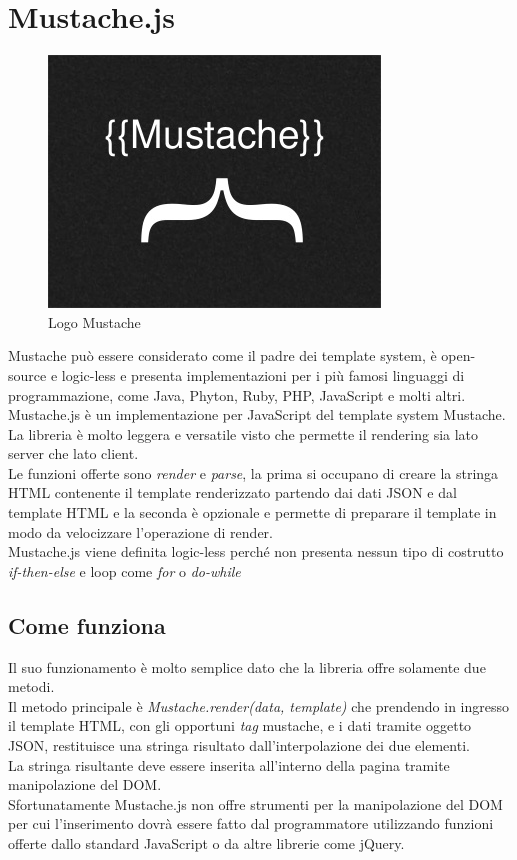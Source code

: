\newpage

\section{Mustache.js}

\begin{figure}[htp]
	\centering
	\includegraphics[scale=0.44]{../immagini/mustache_logo_2}
	\caption{Logo  Mustache}
\end{figure}

Mustache può essere considerato come il padre dei template system, è open-source e logic-less e presenta implementazioni per i più famosi linguaggi di programmazione, come Java, Phyton, Ruby, PHP, JavaScript e molti altri.\\
Mustache.js è un implementazione per JavaScript del template system Mustache.\\
La libreria è molto leggera e versatile visto che permette il rendering sia lato server che lato client.\\
Le funzioni offerte sono \textit{render} e \textit{parse}, la prima si occupano di creare la stringa HTML contenente il template renderizzato partendo dai dati JSON e dal template HTML e la seconda è opzionale e permette di preparare il template in modo da velocizzare l'operazione di render.\\
Mustache.js viene definita logic-less perché non presenta nessun tipo di costrutto \textit{if-then-else} e loop come \textit{for} o \textit{do-while}
\subsection{Come funziona}
Il suo funzionamento è molto semplice dato che la libreria offre solamente due metodi.\\
Il metodo principale è \textit{Mustache.render(data, template)} che prendendo in ingresso il template HTML, con gli opportuni \textit{tag} mustache, e i dati tramite oggetto JSON, restituisce una stringa risultato dall'interpolazione dei due elementi.\\
La stringa risultante deve essere inserita all'interno della pagina tramite manipolazione del DOM.\\
Sfortunatamente Mustache.js non offre strumenti per la manipolazione del DOM per cui l'inserimento dovrà essere fatto dal programmatore utilizzando funzioni offerte dallo standard JavaScript o da altre librerie come jQuery.
